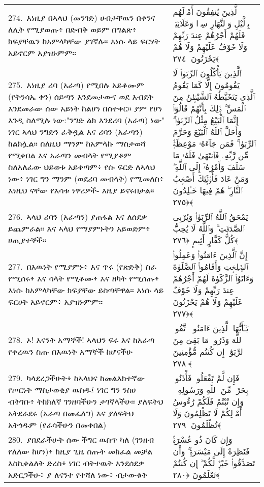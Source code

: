 \documentclass[11pt,a4paper,oneside]{article}%
\newcommand{\mytextarabic}[1]{\textarabic{ #1 \flushright}}
\begin{document}
\begin{longtable}{%
  @{}
    p{}
  @{~~~}
    p{}
    @{}
}
274.\ እነዚያ በኣላህ (መንገድ) ሀብታቸዉን በቀንና ለሊት የሚያወጡ፥ በድብቅ ወይም በግልጽ፥ ክፍያቸዉን ከአምላካቸው ያገኛሉ። እነሱ ላይ ፍርሃት አይኖርም አያዝኑምም። &  \mytextarabic{ٱلَّذِينَ يُنفِقُونَ أَمْوَٟلَهُم بِٱلَّيْلِ وَٱلنَّهَارِ سِرًّۭا وَعَلَانِيَةًۭ فَلَهُمْ أَجْرُهُمْ عِندَ رَبِّهِمْ وَلَا خَوْفٌ عَلَيْهِمْ وَلَا هُمْ يَحْزَنُونَ ﴿٢٧٤﴾}\\
275.\ እነዚያ ሪባ (አራጣ) የሚበሉ አይቆሙም (የትንሳኤ ቀን) ሰይጣን እንደመታውና ወደ እብደት እንደመራው ሰው አይነት ከልሆነ በስተቀር። ያም የሆነ እንዲ ስለሚሉ ነው:"ንግድ ልክ እንደሪባ (አራጣ) ነው" ነገር ኣላህ ንግድን ፈቅዷል እና ሪባን (አራጣን) ከልክሏል። ስለዚህ ማንም ከአምላኩ ማስታወሻ የሚቀበል እና አራጣን መብላት የሚያቆም ስለአለፈው ህይወቱ አይቀጣም፥ የሱ ፍርድ ለኣላህ ነው፥ ነገር ግን ማንም (ወደሪባ መብላት) የሚመለስ፥ እነዚህ ናቸው የእሳቱ ነዋሪዎች- እዚያ ይኖሩበታል። &  \mytextarabic{ٱلَّذِينَ يَأْكُلُونَ ٱلرِّبَوٰا۟ لَا يَقُومُونَ إِلَّا كَمَا يَقُومُ ٱلَّذِى يَتَخَبَّطُهُ ٱلشَّيْطَٟنُ مِنَ ٱلْمَسِّ ۚ ذَٟلِكَ بِأَنَّهُمْ قَالُوٓا۟ إِنَّمَا ٱلْبَيْعُ مِثْلُ ٱلرِّبَوٰا۟ ۗ وَأَحَلَّ ٱللَّهُ ٱلْبَيْعَ وَحَرَّمَ ٱلرِّبَوٰا۟ ۚ فَمَن جَآءَهُۥ مَوْعِظَةٌۭ مِّن رَّبِّهِۦ فَٱنتَهَىٰ فَلَهُۥ مَا سَلَفَ وَأَمْرُهُۥٓ إِلَى ٱللَّهِ ۖ وَمَنْ عَادَ فَأُو۟لَٟٓئِكَ أَصْحَٟبُ ٱلنَّارِ ۖ هُمْ فِيهَا خَـٰلِدُونَ ﴿٢٧٥﴾}\\
276.\ ኣላህ ሪባን (አራጣን) ያጠፋል እና ለሰደቃ ይጨምራል። እና ኣላህ የማያምኑትን አይወድም፥ ሀጢያተኞች። &  \mytextarabic{يَمْحَقُ ٱللَّهُ ٱلرِّبَوٰا۟ وَيُرْبِى ٱلصَّدَقَٟتِ ۗ وَٱللَّهُ لَا يُحِبُّ كُلَّ كَفَّارٍ أَثِيمٍ ﴿٢٧٦﴾}\\
277.\ በእዉነት የሚያምኑ፥ እና ጥሩ (የጽድቅ) ስራ የሚሰሩ፥ እና ሳላት የሚቆሙ፥ እና ዘካት የሚሰጡ፥ እነሱ ከአምላካቸው ክፍያቸው ይስጣቸዋል። እነሱ ላይ ፍርሀት አይኖርም፥ አያዝኑምም። &  \mytextarabic{إِنَّ ٱلَّذِينَ ءَامَنُوا۟ وَعَمِلُوا۟ ٱلصَّٟلِحَٟتِ وَأَقَامُوا۟ ٱلصَّلَوٰةَ وَءَاتَوُا۟ ٱلزَّكَوٰةَ لَهُمْ أَجْرُهُمْ عِندَ رَبِّهِمْ وَلَا خَوْفٌ عَلَيْهِمْ وَلَا هُمْ يَحْزَنُونَ ﴿٢٧٧﴾}\\
278.\ ኦ! እናንት አማኞች! ኣላህን ፍሩ እና ከአራጣ የቀረዉን ስጡ በእዉነት አማኞች ከሆናችሁ &  \mytextarabic{يَـٰٓأَيُّهَا ٱلَّذِينَ ءَامَنُوا۟ ٱتَّقُوا۟ ٱللَّهَ وَذَرُوا۟ مَا بَقِىَ مِنَ ٱلرِّبَوٰٓا۟ إِن كُنتُم مُّؤْمِنِينَ ﴿٢٧٨﴾}\\
279.\ ካላደረጋችሁት፥ ከኣላህና ከመልእክተኛው የጦርነት ማስታወቂያ ዉስዱ፤ ነገር ግን ንስሀ ብትገቡ፥ ትክክለኛ ገንዘባችሁን ታገኛላችሁ። ያለፍትህ አትደራደሩ (አራጣ በመፈለግ) እና ያለፍትህ አትጎዱም (የራሳችሁን በመቀበል) &  \mytextarabic{فَإِن لَّمْ تَفْعَلُوا۟ فَأْذَنُوا۟ بِحَرْبٍۢ مِّنَ ٱللَّهِ وَرَسُولِهِۦ ۖ وَإِن تُبْتُمْ فَلَكُمْ رُءُوسُ أَمْوَٟلِكُمْ لَا تَظْلِمُونَ وَلَا تُظْلَمُونَ ﴿٢٧٩﴾}\\
280.\ ያበደራችሁት ሰው ችግር ዉስጥ ካለ (ገንዘብ የለለው ከሆነ)፥ ከዚያ ጊዜ ስጡት መክፈል መቻል እስኪቀልለት ድረስ፥ ነገር ብትተዉት እንደሰደቃ አድርጋችሁ፥ ያ ለናንተ የተሻለ ነው፥ ብታውቁት &  \mytextarabic{وَإِن كَانَ ذُو عُسْرَةٍۢ فَنَظِرَةٌ إِلَىٰ مَيْسَرَةٍۢ ۚ وَأَن تَصَدَّقُوا۟ خَيْرٌۭ لَّكُمْ ۖ إِن كُنتُمْ تَعْلَمُونَ ﴿٢٨٠﴾}\\

\end{longtable}
\end{document}
